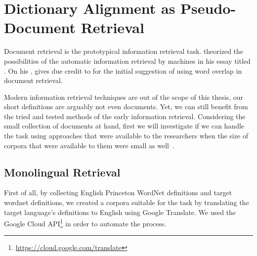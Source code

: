 
\chapter{Dictionary Alignment as Pseudo-Document Retrieval}%
\label{chap:retrieval}

Document retrieval is the prototypical information retrieval task.
\textcite{bush_as_1945} theorized the possibilities of the automatic information retrieval by machines in his essay titled .
On his , \textcite{singhal_modern_2001} gives due credit to \textcite{luhn_statistical_1957} for the initial suggestion of using word overlap in document retrieval.

Modern information retrieval techniques are out of the scope of this thesis, our short definitions are arguably not even documents.
Yet, we can still benefit from the tried and tested methods of the early information retrieval.
Considering the small collection of documents at hand, first we will investigate if we can handle the task using approaches that were available to the researchers when the size of corpora that were available to them were small as well~\cite{singhal_modern_2001}.

\section{Monolingual Retrieval}%
\label{sec:monolingual_retrieval}

First of all, by collecting English Princeton WordNet definitions and target wordnet definitions, we created a corpora suitable for the task by translating the target language's definitions to English using Google Translate.
We used the Google Cloud API\footnote{\url{https://cloud.google.com/translate}} in order to automate the process.

